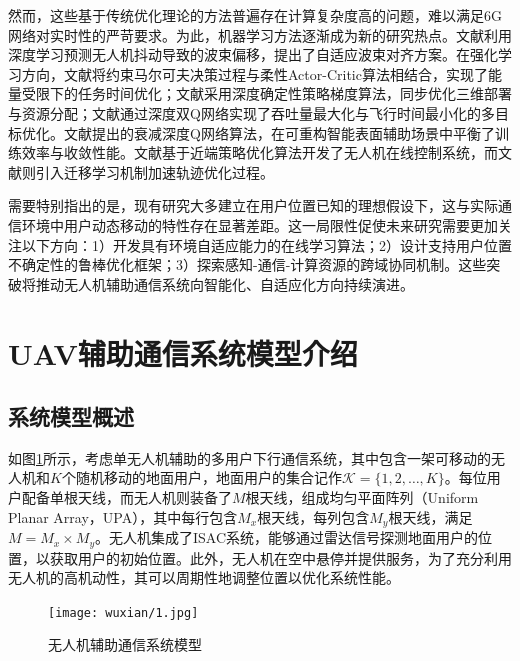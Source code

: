 \documentclass{article}
\begin{document}
  然而，这些基于传统优化理论的方法普遍存在计算复杂度高的问题，难以满足6G网络对实时性的严苛要求。为此，机器学习方法逐渐成为新的研究热点。文献\cite{yuan2020learning}利用深度学习预测无人机抖动导致的波束偏移，提出了自适应波束对齐方案。在强化学习方向，文献\cite{zhou2022constrained}将约束马尔可夫决策过程与柔性Actor-Critic算法相结合，实现了能量受限下的任务时间优化；文献\cite{khurshid2023drl}采用深度确定性策略梯度算法，同步优化三维部署与资源分配；文献\cite{bayerlein2020uav}通过深度双Q网络实现了吞吐量最大化与飞行时间最小化的多目标优化。文献\cite{liu2020machine}提出的衰减深度Q网络算法，在可重构智能表面辅助场景中平衡了训练效率与收敛性能。文献\cite{zhang2023deep}基于近端策略优化算法开发了无人机在线控制系统，而文献\cite{zhang2020trajectory}则引入迁移学习机制加速轨迹优化过程。

  需要特别指出的是，现有研究大多建立在用户位置已知的理想假设下，这与实际通信环境中用户动态移动的特性存在显著差距。这一局限性促使未来研究需要更加关注以下方向：1）开发具有环境自适应能力的在线学习算法；2）设计支持用户位置不确定性的鲁棒优化框架；3）探索感知-通信-计算资源的跨域协同机制。这些突破将推动无人机辅助通信系统向智能化、自适应化方向持续演进。

\section{UAV辅助通信系统模型介绍}
    \subsection{系统模型概述}
    如图\ref{Fig3-1}所示，考虑单无人机辅助的多用户下行通信系统，其中包含一架可移动的无人机和$K$个随机移动的地面用户，地面用户的集合记作$\mathcal{K}=\{1,2,\ldots,K\}$。每位用户配备单根天线，而无人机则装备了$M$根天线，组成均匀平面阵列（Uniform Planar Array，UPA），其中每行包含$M_x$根天线，每列包含$M_y$根天线，满足$M = M_x\times M_y$。无人机集成了ISAC系统，能够通过雷达信号探测地面用户的位置，以获取用户的初始位置。此外，无人机在空中悬停并提供服务，为了充分利用无人机的高机动性，其可以周期性地调整位置以优化系统性能。
    \begin{figure}[h]
      \centering
      \texttt{[image: wuxian/1.jpg]}
      \caption{无人机辅助通信系统模型}
      \label{Fig3-1}
  \end{figure}
\end{document}
